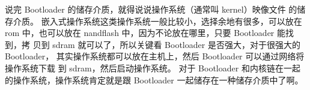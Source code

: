 说完 Bootloader 的储存介质，就得说说操作系统（通常叫 kernel）映像文件
的储存介质。
嵌入式操作系统这类操作系统一般比较小，选择余地有很多，可以放在 rom
中，也可以放在 nandflash 中，因为不论放在哪里，只要 Bootloader 能找到，拷
贝到 sdram 就可以了，所以关键看 Bootloader 是否强大，对于很强大的 Bootloader，
其实操作系统都可以放在主机上，然后 Bootloader 可以通过网络将操作系统下载
到 sdram，然后启动操作系统。
对于 Bootloader 和内核链在一起的操作系统，操作系统肯定就是跟
Bootloader 一起储存在一种储存介质中了啊。
